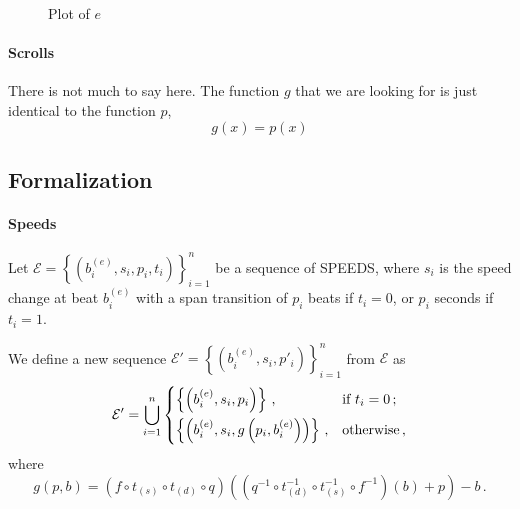 \documentclass[a4paper,9pt]{article}
\begin{document}
\begin{figure}[htpb]
	\centering
\caption{Plot of $ e $}
	\label{fig:speeds-example}
\end{figure}

\paragraph{Scrolls}

There is not much to say here. The function $ g $ that we are looking for is just identical to the function $p$,
\begin{equation}
	g(x) = p(x)
	\label{eq:ddd}
\end{equation}

\subsection{Formalization}
\paragraph{Speeds}
Let $ \mathcal{E} =  \left\{\left( b_i^{(e)}, s_i, p_i, t_i \right)\right\}_{i=1}^{n} $ be a sequence of SPEEDS, where $ s_i $ is the speed change at beat $ b_i^{(e)} $ with a span transition of $ p_i $ beats if $ t_i = 0 $, or $ p_i $ seconds if $ t_i=1 $. 

We define a new sequence $ \mathcal{E'} =  \left\{\left( b_i^{(e)}, s_i, p'_i \right)\right\}_{i=1}^{n}$ from $ \mathcal{E} $ as
\begin{equation}
	\mathcal{E'} = \bigcup_{i=1}^{n} \begin{dcases}
		\left\{\left( b_i^{(e)}, s_i, p_i \right)\right\}\,, & \text{if $ t_i =0 $}\,;\\
		\left\{\left( b_i^{(e)}, s_i,g \left( p_i, b_i^{(e)} \right)  \right)\right\}\,, & \text{otherwise}\,,\\
	\end{dcases}
	\label{eq:eprime}
\end{equation}
where 
\begin{equation}
	g(p,b) =\left( f \circ t_{(s)} \circ t_{(d)}\circ q  \right)\left(  \left( q^{-1}\circ t_{(d)}^{-1} \circ  t_{(s)}^{-1} \circ f^{-1} \right)(b) + p \right)-b\,.
	\label{eq:iureio}
\end{equation}
\end{document}
